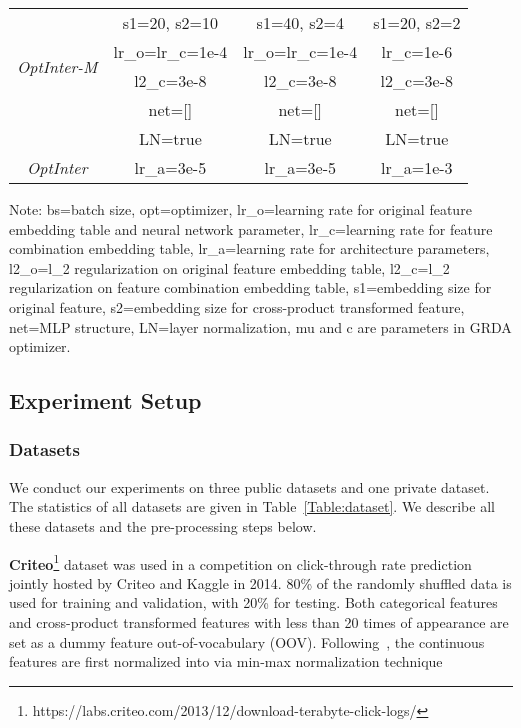 \documentclass[conference]{IEEEtran}
\begin{document}
\begin{table}[!htbp]
\begin{tabular}{|c|c|c|c|}
		\hline
		    \multirow{4}{*}{\textit{OptInter-M}} & s1=20, s2=10 & s1=40, s2=4 & s1=20, s2=2 \\
		    \multirow{4}{*}{\textit{OptInter-F}} & lr\_o=lr\_c=1e-4 & lr\_o=lr\_c=1e-4 & lr\_c=1e-6 \\
		        & l2\_c=3e-8 & l2\_c=3e-8 & l2\_c=3e-8 \\
		        & net=[] & net=[] & net=[] \\
		        & LN=true & LN=true & LN=true \\
		    \textit{OptInter} & lr\_a=3e-5 & lr\_a=3e-5 & lr\_a=1e-3 \\
		\hline
	\end{tabular}
	\begin{tablenotes}
    \footnotesize
    \item[1] Note: bs=batch size, opt=optimizer, lr\_o=learning rate for original feature embedding table and neural network parameter, lr\_c=learning rate for feature combination embedding table, lr\_a=learning rate for architecture parameters,  l2\_o=l\_2 regularization on original feature embedding table, l2\_c=l\_2 regularization on feature combination embedding table, s1=embedding size for original feature, s2=embedding size for cross-product transformed feature, net=MLP structure, LN=layer normalization, mu and c are parameters in GRDA optimizer\cite{GRDA}.
    \end{tablenotes}
	\label{Table:param}
\end{table}

\subsection{Experiment Setup}
\subsubsection{Datasets}
We conduct our experiments on three public datasets and one private dataset. The statistics of all datasets are given in Table~\ref{Table:dataset}. We describe all these datasets and the pre-processing steps below.

\textbf{Criteo}\footnote{https://labs.criteo.com/2013/12/download-terabyte-click-logs/} dataset was used in a competition on click-through rate prediction jointly hosted by Criteo and Kaggle in 2014. 80\% of the randomly shuffled data is used for training and validation, with 20\% for testing. Both categorical features and cross-product transformed features with less than 20 times of appearance are set as a dummy feature out-of-vocabulary (OOV). Following~\cite{DeepFM}, the continuous features are first normalized into  via min-max normalization technique
\end{document}
